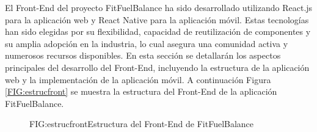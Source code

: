 El Front-End del proyecto FitFuelBalance ha sido desarrollado utilizando React.js para la aplicación web y React Native para la aplicación móvil. Estas tecnologías han sido elegidas por su flexibilidad, capacidad de reutilización de componentes y su amplia adopción en la industria, lo cual asegura una comunidad activa y numerosos recursos disponibles. En esta sección se detallarán los aspectos principales del desarrollo del Front-End, incluyendo la estructura de la aplicación web y la implementación de la aplicación móvil. A continuación Figura \ref{FIG:estrucfront} se muestra la estructura del Front-End de la aplicación FitFuelBalance.

\begin{figure}[Estructura del Front-End]{FIG:estrucfront}{Estructura del Front-End de FitFuelBalance}
\end{figure}